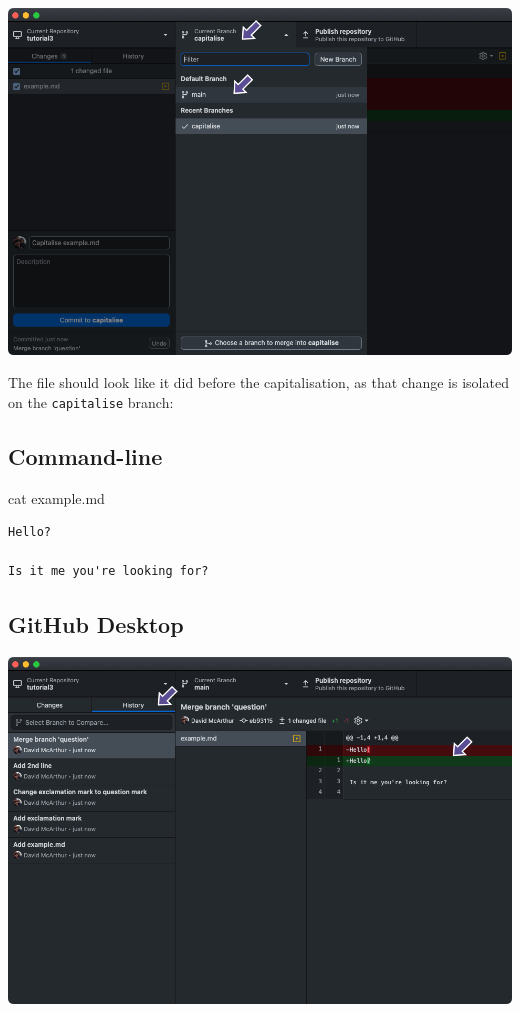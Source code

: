 \documentclass[
  letterpaper,
  DIV=11,
  numbers=noendperiod]{scrartcl}
\newenvironment{Shaded}{\begin{snugshade}}{\end{snugshade}}
\newcommand{\NormalTok}[1]{\textcolor[rgb]{0.00,0.23,0.31}{#1}}
\begin{document}
\includegraphics{images/image48.png}

The file should look like it did before the capitalisation, as that
change is isolated on the \texttt{capitalise} branch:

\subsection{Command-line}

\begin{Shaded}
\begin{Highlighting}[]
\NormalTok{cat example.md}
\end{Highlighting}
\end{Shaded}

\begin{verbatim}
Hello?

Is it me you're looking for?
\end{verbatim}

\subsection{GitHub Desktop}

\includegraphics{images/image49.png}
\end{document}
